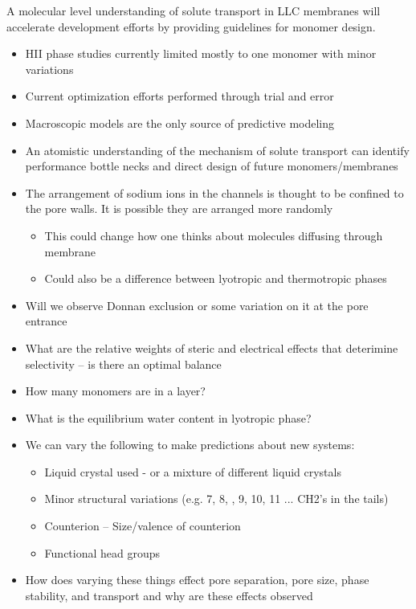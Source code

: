 \documentclass{article}
\begin{document}
A molecular level understanding of solute transport in LLC membranes will accelerate development efforts by providing guidelines for monomer design.
\begin{itemize}
	\item HII phase studies currently limited mostly to one monomer with minor variations
	\item Current optimization efforts performed through trial and error
	\item Macroscopic models are the only source of predictive modeling
	\item An atomistic understanding of the mechanism of solute transport can identify
	performance bottle necks and direct design of future monomers/membranes
	\item The arrangement of sodium ions in the channels is thought to be confined to the pore walls. It is possible they are arranged more randomly
	\begin{itemize}
		\item This could change how one thinks about molecules diffusing through membrane
		\item Could also be a difference between lyotropic and thermotropic phases
	\end{itemize}
	\item Will we observe Donnan exclusion or some variation on it at the pore entrance
	\item What are the relative weights of steric and electrical effects that deterimine selectivity -- is there an optimal balance 
	\item How many monomers are in a layer?
	\item What is the equilibrium water content in lyotropic phase?
	\item We can vary the following to make predictions about new systems:
	\begin{itemize}
		\item Liquid crystal used - or a mixture of different liquid crystals
		\item Minor structural variations (e.g. 7, 8, , 9, 10, 11 ... CH2's in the tails)
		\item Counterion -- Size/valence of counterion
		\item Functional head groups
	\end{itemize}
	\item How does varying these things effect pore separation, pore size, phase stability, and transport and why are these effects observed 
\end{itemize}
\end{document}
